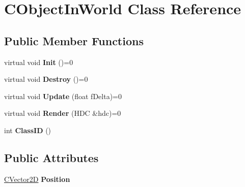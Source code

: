 \hypertarget{class_c_object_in_world}{}\section{C\+Object\+In\+World Class Reference}
\label{class_c_object_in_world}
\subsection*{Public Member Functions}
\begin{DoxyCompactItemize}
\item 
virtual void {\bfseries Init} ()=0\hypertarget{class_c_object_in_world_a3bef1b277cbb1be8d6ad55430d0ca3f7}{}\label{class_c_object_in_world_a3bef1b277cbb1be8d6ad55430d0ca3f7}

\item 
virtual void {\bfseries Destroy} ()=0\hypertarget{class_c_object_in_world_a830b53b22da109b6bb29c1d9f7dd4777}{}\label{class_c_object_in_world_a830b53b22da109b6bb29c1d9f7dd4777}

\item 
virtual void {\bfseries Update} (float f\+Delta)=0\hypertarget{class_c_object_in_world_a39ecdfc825416c8d1b4d53b01b077d75}{}\label{class_c_object_in_world_a39ecdfc825416c8d1b4d53b01b077d75}

\item 
virtual void {\bfseries Render} (H\+DC \&hdc)=0\hypertarget{class_c_object_in_world_ae7a5e4094fe36c024bc7e805978d4033}{}\label{class_c_object_in_world_ae7a5e4094fe36c024bc7e805978d4033}

\item 
int {\bfseries Class\+ID} ()\hypertarget{class_c_object_in_world_aefd307c9877054425151579299c0c577}{}\label{class_c_object_in_world_aefd307c9877054425151579299c0c577}

\end{DoxyCompactItemize}
\subsection*{Public Attributes}
\begin{DoxyCompactItemize}
\item 
\hyperlink{struct_c_vector2_d}{C\+Vector2D} {\bfseries Position}\hypertarget{class_c_object_in_world_a8f05b8be71632f98f9f49621f92045fe}{}\label{class_c_object_in_world_a8f05b8be71632f98f9f49621f92045fe}

\end{DoxyCompactItemize}
